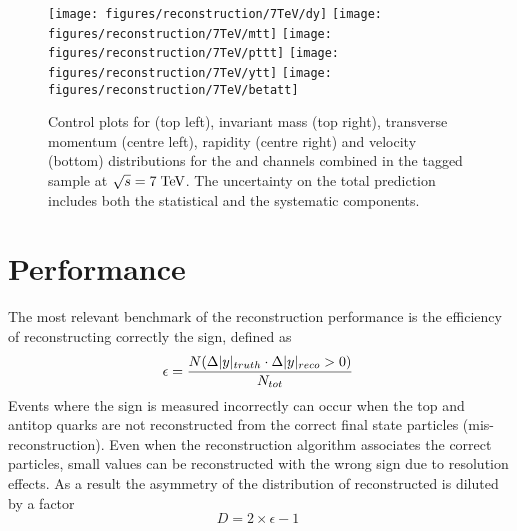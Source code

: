 \begin{figure}[!htb]\centering
  \texttt{[image: figures/reconstruction/7TeV/dy]}
  \texttt{[image: figures/reconstruction/7TeV/mtt]}
  \texttt{[image: figures/reconstruction/7TeV/pttt]}
  \texttt{[image: figures/reconstruction/7TeV/ytt]}
  \texttt{[image: figures/reconstruction/7TeV/betatt]}
  \caption[Control plots for reconstructed quantities at $\sqrt{s} = 7
  \TeV{}$]{Control plots for \dy{} (top left), invariant mass \mtt{} 
    (top right), transverse momentum \pttt{} (centre left), rapidity
    \ytt{} (centre right) and velocity \betatt{} (bottom)
    distributions for the \ejets{} and \mujets{} channels combined in the
    tagged sample at $\sqrt{s} = 7 \TeV{}$. The uncertainty on the
    total prediction includes both the statistical and the systematic
    components.} 
  \label{fig:datamcreco2011}
\end{figure}



\section{Performance}

The most relevant benchmark of the reconstruction performance is the
efficiency of reconstructing correctly the \dy{} sign, defined as
\begin{equation}
  \label{eq:dysign}
  \epsilon = \frac{N(\mbox{$\Delta|y|$}{}_{truth}\cdot\mbox{$\Delta|y|$}{}_{reco}>0)}{N_{tot}}\phantom{.}
\end{equation}
Events where the \dy{} sign is measured incorrectly can occur when the top and
antitop quarks are not reconstructed from the correct final
state particles (mis-reconstruction). Even when the reconstruction
algorithm associates the correct particles, small \dy{} values can be
reconstructed with the wrong sign due to resolution effects.
As a result the asymmetry of the distribution of reconstructed \dy{}
is diluted by a factor 
\begin{equation}
  \label{eq:dilution}
D = 2\times{}\epsilon - 1\phantom{.}
\end{equation}  
 

